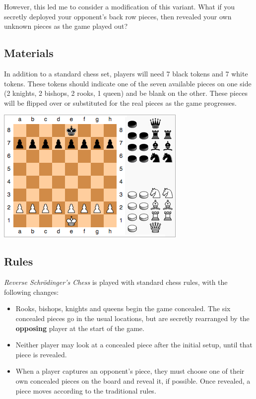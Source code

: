 \documentclass{article}
\begin{document}
However, this led me to consider a modification of this variant. What if you secretly deployed your opponent's back row pieces, then revealed your own unknown pieces as the game played out?

\newpage

\subsection{Materials}
In addition to a standard chess set, players will need 7 black tokens and 7 white tokens. These tokens should indicate one of the seven available pieces on one side (2 knights, 2 bishops, 2 rooks, 1 queen) and be blank on the other. These pieces will be flipped over or substituted for the real pieces as the game progresses.

\begin{center}
\includegraphics[width=0.5\linewidth]{reverse}
\end{center}

\subsection{Rules}
\textit{Reverse Schr\"{o}dinger's Chess} is played with standard chess rules, with the following changes:

\begin{itemize}
\item Rooks, bishops, knights and queens begin the game concealed. The six concealed pieces go in the usual locations, but are secretly rearranged by the \textbf{opposing} player at the start of the game.
\item Neither player may look at a concealed piece after the initial setup, until that piece is revealed.
\item When a player captures an opponent's piece, they must choose one of their own concealed pieces on the board and reveal it, if possible. Once revealed, a piece moves according to the traditional rules.
\end{itemize}
\end{document}
